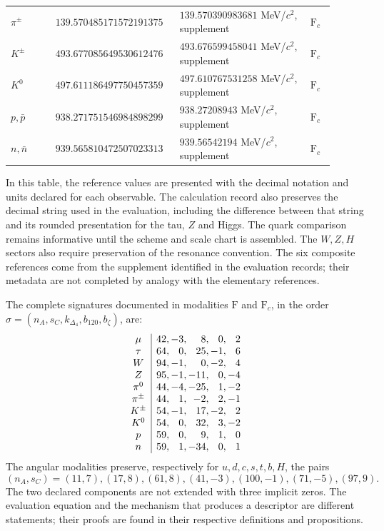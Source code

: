 \begin{longtable}{p{0.13\linewidth}p{0.32\linewidth}p{0.38\linewidth}p{0.07\linewidth}}
\(\pi^\pm\) & \(139.570485171\allowbreak572191375\) & \(139.570390983681\) MeV/\(c^2\), supplement & \(\mathrm F_c\)\\
\(K^\pm\) & \(493.677085649\allowbreak530612476\) & \(493.676599458041\) MeV/\(c^2\), supplement & \(\mathrm F_c\)\\
\(K^0\) & \(497.611186497\allowbreak750457359\) & \(497.610767531258\) MeV/\(c^2\), supplement & \(\mathrm F_c\)\\
\(p,\bar p\) & \(938.271751546\allowbreak984898299\) & \(938.27208943\) MeV/\(c^2\), supplement & \(\mathrm F_c\)\\
\(n,\bar n\) & \(939.565810472\allowbreak507023313\) & \(939.56542194\) MeV/\(c^2\), supplement & \(\mathrm F_c\)\\
\end{longtable}
\endgroup

In this table, the reference values are presented with the decimal
notation and units declared for each observable. The calculation
record also preserves the decimal string used in the evaluation,
including the difference between that string and its rounded presentation for
the tau, \(Z\) and Higgs. The quark comparison
remains informative until the scheme and scale chart is assembled.
The \(W,Z,H\) sectors also require preservation of the resonance
convention. The six composite references come from the supplement
identified in the evaluation records; their metadata are not completed
by analogy with the elementary references.

The complete signatures documented in modalities \(\mathrm F\) and
\(\mathrm F_c\), in the order
\(\sigma=(n_A,s_C,k_{\Delta_4},b_{120},b_\zeta)\), are:
\[
\begin{array}{c|r@{,\,}r@{,\,}r@{,\,}r@{,\,}r}
\mu&42&-3&8&0&2\\
\tau&64&0&25&-1&6\\
W&94&-1&0&-2&4\\
Z&95&-1&-11&0&-4\\
\pi^0&44&-4&-25&1&-2\\
\pi^\pm&44&1&-2&2&-1\\
K^\pm&54&-1&17&-2&2\\
K^0&54&0&32&3&-2\\
p&59&0&9&1&0\\
n&59&1&-34&0&1
\end{array}
\]
The angular modalities preserve, respectively for
\(u,d,c,s,t,b,H\), the pairs
\[
(n_A,s_C)=(11,7),(17,8),(61,8),(41,-3),(100,-1),(71,-5),(97,9).
\]
The two declared components are not extended with
three implicit zeros. The evaluation equation and the mechanism that
produces a descriptor are different statements; their proofs
are found in their respective definitions and propositions.

